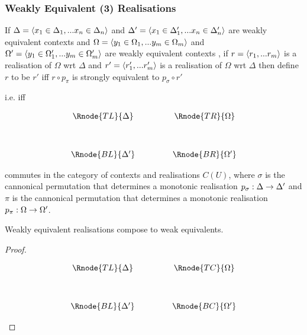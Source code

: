 \documentclass[10pt,a4paper]{scrartcl}
\begin{document}
\subsubsection{Weakly Equivalent (3) Realisations}
\begin{definition}
If $\Delta=\langle x_1 \in \Delta_1,... x_{n} \in \Delta_{n}\rangle$ and $\Delta'=\langle x_1 \in \Delta'_1,... x_{n} \in \Delta'_{n}\rangle$ are weakly equivalent 
contexts \inagat \gat and $\Omega=\langle y_1 \in \Omega_1,... y_{m} \in \Omega_{m}\rangle$ and $\Omega'=\langle y_1 \in \Omega'_1,... y_{m} \in \Omega'_{m}\rangle$ are weakly equivalent contexts \ingat,
if $r=\langle r_1,...r_m\rangle$ is a realisation of $\Omega$ wrt $\Delta$ 
and $r'=\langle r'_1,...r'_m\rangle$ is a realisation of $\Omega$ wrt $\Delta$ 
then
define $r$ to be  $r'$ 
iff $r \circ p_\pi$ is strongly equivalent to $p_\sigma \circ r'$

i.e. iff
\vspace{3mm}
\begin{center}
\begin{displaymath}
\begin{array}{cp{.9cm}c}
\Rnode{TL}{\Delta} & & \Rnode{TR}{\Omega}\\ [1.2cm]
\Rnode{BL}{\Delta'}         & & \Rnode{BR}{\Omega'}
\end{array}
\end{displaymath}
\alabel{[r]}
\blabel{[p_\sigma]}
\blabel{[r']}
\alabel{[p_\pi]}
\end{center} commutes
in the category of contexts and realisations $C(U)$,
where $\sigma$ is the cannonical permutation  that determines a monotonic realisation $p_\sigma: \Delta \rightarrow \Delta'$ 
and  $\pi$ is the cannonical permutation  that determines a monotonic realisation $p_\pi: \Omega \rightarrow \Omega'$.
\end{definition}

\begin{lemma}
Weakly equivalent realisations compose to weak equivalents.
\end{lemma}
\begin{proof} \\
\begin{center}
\begin{displaymath}
\begin{array}{cp{.9cm}c}
\Rnode{TL}{\Delta} & & \Rnode{TC}{\Omega}\\ [1.2cm]
\Rnode{BL}{\Delta'}         & & \Rnode{BC}{\Omega'}
\end{array}
\end{displaymath}
\alabel{[r]}
\blabel{[p_\sigma]}
\blabel{[r']}
\alabel{[p_\pi]}
\end{center}
\end{proof}
\end{document}
